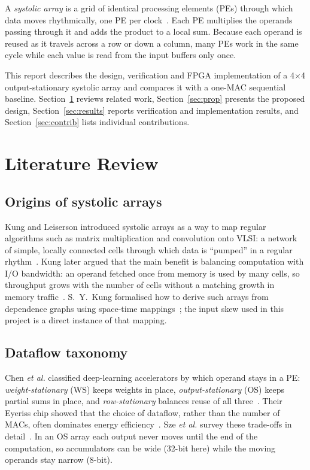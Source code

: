 \documentclass[conference]{IEEEtran}
\begin{document}
A \emph{systolic array} is a grid of identical processing elements (PEs) through
which data moves rhythmically, one PE per clock~\cite{kung1979,kung1982}. Each
PE multiplies the operands passing through it and adds the product to a local
sum. Because each operand is reused as it travels across a row or down a
column, many PEs work in the same cycle while each value is read from the input
buffers only once.

This report describes the design, verification and FPGA implementation of a
4$\times$4 output-stationary systolic array and compares it with a one-MAC
sequential baseline. Section~\ref{sec:lit} reviews related work,
Section~\ref{sec:prop} presents the proposed design, Section~\ref{sec:results}
reports verification and implementation results, and
Section~\ref{sec:contrib} lists individual contributions.

\section{Literature Review}\label{sec:lit}

\subsection{Origins of systolic arrays}
Kung and Leiserson introduced systolic arrays as a way to map regular
algorithms such as matrix multiplication and convolution onto VLSI: a network of
simple, locally connected cells through which data is ``pumped'' in a regular
rhythm~\cite{kung1979}. Kung later argued that the main benefit is balancing
computation with I/O bandwidth: an operand fetched once from memory is used by
many cells, so throughput grows with the number of cells without a matching
growth in memory traffic~\cite{kung1982}. S.~Y.~Kung formalised how to derive
such arrays from dependence graphs using space-time mappings~\cite{skung1988};
the input skew used in this project is a direct instance of that mapping.

\subsection{Dataflow taxonomy}
Chen \emph{et al.} classified deep-learning accelerators by which operand stays
in a PE: \emph{weight-stationary} (WS) keeps weights in place,
\emph{output-stationary} (OS) keeps partial sums in place, and
\emph{row-stationary} balances reuse of all three~\cite{chen2016}. Their Eyeriss
chip showed that the choice of dataflow, rather than the number of MACs, often
dominates energy efficiency~\cite{chen2017}. Sze \emph{et al.} survey these
trade-offs in detail~\cite{sze2017}. In an OS array each output never moves
until the end of the computation, so accumulators can be wide (32-bit here)
while the moving operands stay narrow (8-bit).
\end{document}
